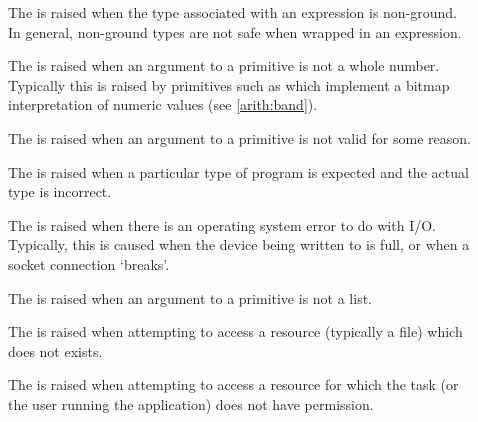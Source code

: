 \begin{description}
\item[]
\label{eINSUFTPE}
  
The  is raised when the type associated with an  expression is non-ground. In general, non-ground types are not safe when wrapped in an  expression.

\item[]
\label{eINTNEEDD}
  
The  is raised when an argument to a primitive is not a whole number. Typically this is raised by primitives such as  which implement a bitmap interpretation of numeric values (see \vref{arith:band}).
  
\item[]
\label{eINVAL}
  
The  is raised when an argument to a primitive is not valid for some reason. 
  
\item[]
\label{eINVOCDE}
  
The  is raised when a particular type of program is expected and the actual type is incorrect.

\item[]
\label{eIOERROR}
  
The  is raised when there is an operating system error to do with I/O. Typically, this is caused when the device being written to is full, or when a socket connection `breaks'.
  
\item[]
\label{eLSTNEEDD}
  
The  is raised when an argument to a primitive is not a list. 
  
\item[]
\label{eNOFILE}
  
The  is raised when attempting to access a resource (typically a file) which does not exists.
  
\item[]
\label{eNOPERM}
  
The  is raised when attempting to access a resource for which the task (or the user running the \go application) does not have permission.
  
\item[]
\label{eNOTFND}
  

\end{description}
